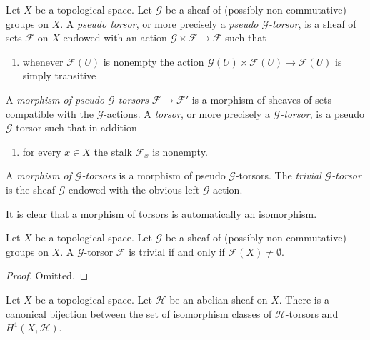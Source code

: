 \begin{definition}
\label{definition-torsor}
Let $X$ be a topological space.
Let $\mathcal{G}$ be a sheaf of (possibly non-commutative) groups on $X$.
A {\it pseudo torsor}, or more precisely a {\it pseudo $\mathcal{G}$-torsor},
is a sheaf of sets $\mathcal{F}$ on $X$ endowed with an action
$\mathcal{G} \times \mathcal{F} \to \mathcal{F}$ such that
\begin{enumerate}
\item whenever $\mathcal{F}(U)$ is nonempty the action
$\mathcal{G}(U) \times \mathcal{F}(U) \to \mathcal{F}(U)$
is simply transitive
\end{enumerate}
A {\it morphism of pseudo $\mathcal{G}$-torsors} $\mathcal{F} \to \mathcal{F}'$
is a morphism of sheaves of sets compatible with the
$\mathcal{G}$-actions. A {\it torsor}, or more precisely a
{\it $\mathcal{G}$-torsor}, is a pseudo $\mathcal{G}$-torsor such
that in addition
\begin{enumerate}
\item[(2)] for every $x \in X$ the stalk $\mathcal{F}_x$ is nonempty.
\end{enumerate}
A {\it morphism of $\mathcal{G}$-torsors} is a morphism of
pseudo $\mathcal{G}$-torsors. The {\it trivial $\mathcal{G}$-torsor}
is the sheaf $\mathcal{G}$ endowed with the obvious left
$\mathcal{G}$-action.
\end{definition}

\noindent
It is clear that a morphism of torsors is automatically an isomorphism.

\begin{lemma}
\label{lemma-trivial-torsor}
Let $X$ be a topological space.
Let $\mathcal{G}$ be a sheaf of (possibly non-commutative) groups on $X$.
A $\mathcal{G}$-torsor $\mathcal{F}$ is trivial if and only if
$\mathcal{F}(X) \not = \emptyset$.
\end{lemma}

\begin{proof}
Omitted.
\end{proof}

\begin{lemma}
\label{lemma-torsors-h1}
Let $X$ be a topological space.
Let $\mathcal{H}$ be an abelian sheaf on $X$.
There is a canonical bijection between the set of isomorphism
classes of $\mathcal{H}$-torsors and $H^1(X, \mathcal{H})$.
\end{lemma}

